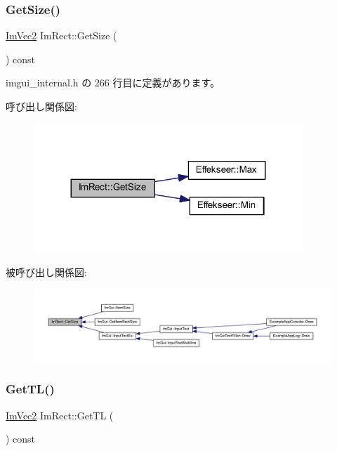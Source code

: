 \subsubsection{\texorpdfstring{Get\+Size()}{GetSize()}}
{\footnotesize\ttfamily \mbox{\hyperlink{struct_im_vec2}{Im\+Vec2}} Im\+Rect\+::\+Get\+Size (\begin{DoxyParamCaption}{ }\end{DoxyParamCaption}) const\hspace{0.3cm}{\ttfamily [inline]}}



 imgui\+\_\+internal.\+h の 266 行目に定義があります。

呼び出し関係図\+:\nopagebreak
\begin{figure}[H]
\begin{center}
\leavevmode
\includegraphics[width=287pt]{struct_im_rect_ae459d9c50003058cfb34519a571aaf33_cgraph}
\end{center}
\end{figure}
被呼び出し関係図\+:\nopagebreak
\begin{figure}[H]
\begin{center}
\leavevmode
\includegraphics[width=350pt]{struct_im_rect_ae459d9c50003058cfb34519a571aaf33_icgraph}
\end{center}
\end{figure}
\mbox{\label{struct_im_rect_a1d4d972329722b51dca4499cb5931b4b}} 
\subsubsection{\texorpdfstring{Get\+T\+L()}{GetTL()}}
{\footnotesize\ttfamily \mbox{\hyperlink{struct_im_vec2}{Im\+Vec2}} Im\+Rect\+::\+Get\+TL (\begin{DoxyParamCaption}{ }\end{DoxyParamCaption}) const\hspace{0.3cm}{\ttfamily [inline]}}



